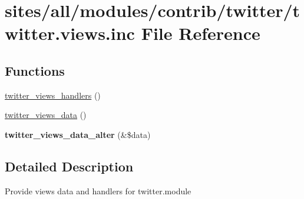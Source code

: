 \hypertarget{twitter_8views_8inc}{
\section{sites/all/modules/contrib/twitter/twitter.views.inc File Reference}
\label{twitter_8views_8inc}
}
\subsection*{Functions}
\begin{CompactItemize}
\item 
\hyperlink{group__views__twitter__module_ga0ef75b4d343006ac49d134b1e430dfb}{twitter\_\-views\_\-handlers} ()
\item 
\hyperlink{group__views__twitter__module_gf85337c107d23196b51d5c13e35f4804}{twitter\_\-views\_\-data} ()
\item 
\hypertarget{group__views__twitter__module_gaa2b6d0348d261b13646346bcd6a3c31}{
\textbf{twitter\_\-views\_\-data\_\-alter} (\&\$data)}
\label{group__views__twitter__module_gaa2b6d0348d261b13646346bcd6a3c31}

\end{CompactItemize}


\subsection{Detailed Description}
Provide views data and handlers for twitter.module 